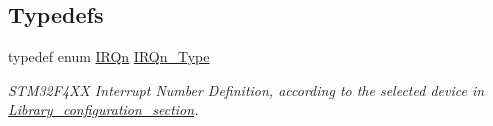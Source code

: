 \subsection*{Typedefs}
\begin{DoxyCompactItemize}
\item 
\mbox{\label{group___configuration__section__for___c_m_s_i_s_gac3af4a32370fb28c4ade8bf2add80251}} 
typedef enum \hyperlink{group___configuration__section__for___c_m_s_i_s_ga666eb0caeb12ec0e281415592ae89083}{I\+R\+Qn} \hyperlink{group___configuration__section__for___c_m_s_i_s_gac3af4a32370fb28c4ade8bf2add80251}{I\+R\+Qn\+\_\+\+Type}
\begin{DoxyCompactList}\small\item\em S\+T\+M32\+F4\+XX Interrupt Number Definition, according to the selected device in \hyperlink{group___library__configuration__section}{Library\+\_\+configuration\+\_\+section}. \end{DoxyCompactList}\end{DoxyCompactItemize}
